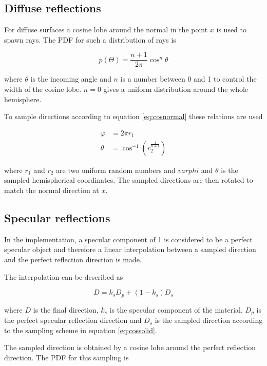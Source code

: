 \documentclass[a4paper]{report}
\begin{document}
\subsection{Diffuse reflections}
For diffuse surfaces a cosine lobe around the normal in the point
\(x\) is used to spawn rays. The PDF for such a distribution of rays
is 

\begin{equation}
  p(\Theta) = \frac{n+1}{2\pi}\cos^n{\theta}
  \label{eq:cosnormal}
\end{equation}

where \(\theta\) is the incoming angle and \(n\) is a number between 0
and 1 to control the width of the cosine lobe. \(n=0\) gives a uniform
distribution around the whole hemisphere.

To sample directions according to equation \ref{eq:cosnormal} these
relations are used

\begin{align}
  \varphi &= 2 \pi r_1 \nonumber \\
  \theta &= \cos^{-1}(r_2^{\frac{1}{n+1}})
\end{align}

where \(r_1\) and \(r_2\) are two uniform random numbers and
\(varphi\) and \(\theta\) is the sampled hemispherical coordinates. The sampled
directions are then rotated to match the normal direction at \(x\).

\subsection{Specular reflections}

In the implementation, a specular component of 1 is considered to be a
perfect specular object and therefore a linear interpolation between a
sampled direction and the perfect reflection direction is made.

The interpolation can be described as

\begin{equation}
  D = k_sD_p + (1-k_s)D_s
\end{equation}

where \(D\) is the final direction, \(k_s\) is the specular
component of the material, \(D_p\) is the perfect specular reflection
direction and \(D_s\) is the sampled direction according to the
sampling scheme in equation \ref{eq:cossolid}.

The sampled direction is obtained by a cosine lobe around the perfect
reflection direction. The PDF for this sampling is
\end{document}
